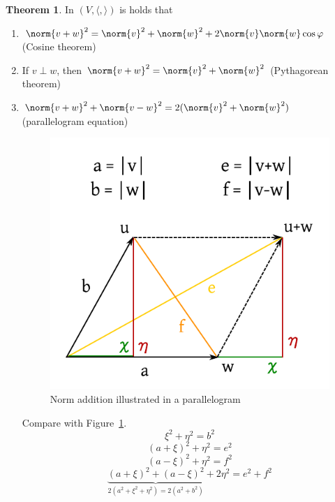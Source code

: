 \documentclass[a4paper,landscape,twocolumn]{article}
\theoremstyle{definition}
\newtheorem{theorem}{Theorem}
\DeclarePairedDelimiter\norm\lVert\rVert
\begin{document}
\begin{theorem}
  \label{satz-8.34}
  In $(V, \langle, \rangle)$ is holds that
  \begin{enumerate}
    \item $\norm{v + w}^2 = \norm{v}^2 + \norm{w}^2 + 2 \norm{v} \norm{w} \cos{\varphi}$ (Cosine theorem)
    \item If $v \perp w$, then $\norm{v + w}^2 = \norm{v}^2 + \norm{w}^2$ (Pythagorean theorem)
    \item $\norm{v + w}^2 + \norm{v - w}^2 = 2 (\norm{v}^2 + \norm{w}^2)$ (parallelogram equation)

      \begin{figure}[!h]
        \begin{center}
          \includegraphics{img/parallelogram_norms.pdf}
          \caption{Norm addition illustrated in a parallelogram}
          \label{img:norm-parallelogram}
        \end{center}
      \end{figure}

      Compare with Figure~\ref{img:norm-parallelogram}.
      \[ \xi^2 + \eta^2 = b^2 \]
      \[ (a + \xi)^2 + \eta^2 = e^2 \]
      \[ (a - \xi)^2 + \eta^2 = f^2 \]
      \[ \underbrace{(a + \xi)^2 + (a - \xi)^2}_{2(a^2 + \xi^2 + \eta^2) = 2 (a^2 + b^2)} + 2\eta^2 = e^2 + f^2 \]
  \end{enumerate}
\end{theorem}
\end{document}
